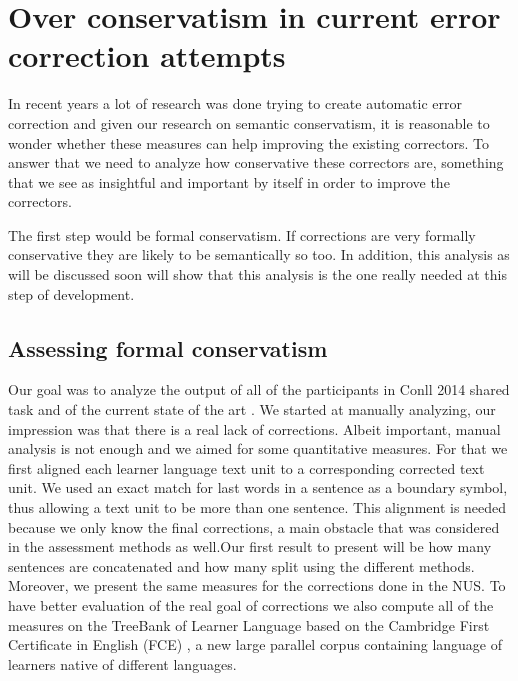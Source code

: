 \documentclass[english]{article}
\begin{document}
\section{Over conservatism in current error correction attempts}

In recent years a lot of research was done trying to create automatic
error correction\cite{rozovskaya2014building,rozovskaya2010annotating,ng2014conll,kao2013conll}
and given our research on semantic conservatism, it is reasonable
to wonder whether these measures can help improving the existing correctors.
To answer that we need to analyze how conservative these correctors
are, something that we see as insightful and important by itself in
order to improve the correctors.

The first step would be formal conservatism. If corrections are very
formally conservative they are likely to be semantically so too. In
addition, this analysis as will be discussed soon will show that this
analysis is the one really needed at this step of development.

\subsection{Assessing formal conservatism}

Our goal was to analyze the output of all of the participants in Conll
2014 shared task\cite{ng2014conll} and of the current state of the
art \cite{rozovskaya2014building}. We started at manually analyzing,
our impression was that there is a real lack of corrections. Albeit
important, manual analysis is not enough and we aimed for some quantitative
measures. For that we first aligned each learner language text unit
to a corresponding corrected text unit. We used an exact match for
last words in a sentence as a boundary symbol, thus allowing a text
unit to be more than one sentence. This alignment is needed because
we only know the final corrections, a main obstacle that was considered
in the assessment methods as well\cite{dahlmeier2012better}.Our first
result to present will be how many sentences are concatenated and
how many split using the different methods. Moreover, we present the
same measures for the corrections done in the NUS\cite{dahlmeier2013building}.
To have better evaluation of the real goal of corrections we also
compute all of the measures on the TreeBank of Learner Language \cite{berzak2016universal}based
on the Cambridge First Certificate in English (FCE) \cite{yannakoudakis2011new},
a new large parallel corpus containing language of learners native
of different languages.
\end{document}
